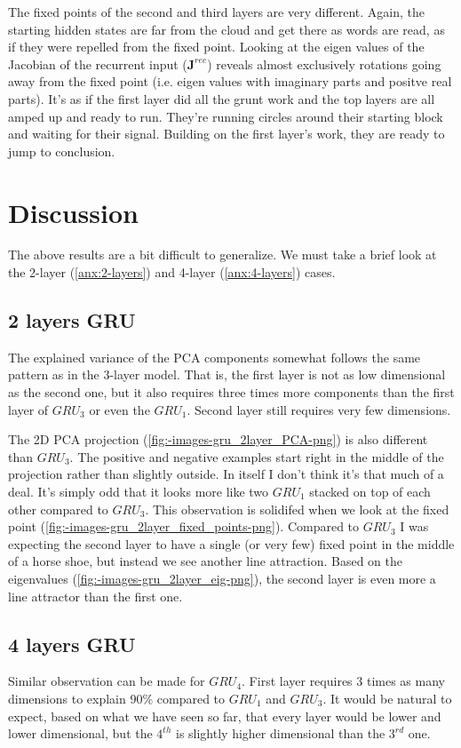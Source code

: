 \documentclass{article}
\begin{document}
The fixed points of the second and third layers are very different. Again, the starting hidden states are far from the cloud and get there as words are read, as if they were repelled from the fixed point. Looking at the eigen values of the Jacobian of the recurrent input ($\textbf{J}^{rec}$) reveals almost exclusively rotations going away from the fixed point (i.e. eigen values with imaginary parts and positve real parts). It's as if the first layer did all the grunt work and the top layers are all amped up and ready to run. They're running circles around their starting block and waiting for their signal. Building on the first layer's work, they are ready to jump to conclusion.

\section{Discussion}

The above results are a bit difficult to generalize. We must take a brief look at the 2-layer (\ref{anx:2-layers}) and 4-layer (\ref{anx:4-layers}) cases.

\subsection{2 layers GRU}
The explained variance of the PCA components somewhat follows the same pattern as in the 3-layer model. That is, the first layer is not as low dimensional as the second one, but it also requires three times more components than the first layer of $GRU_3$ or even the $GRU_1$. Second layer still requires very few dimensions.

The 2D PCA projection (\ref{fig:-images-gru_2layer_PCA-png}) is also different than $GRU_3$. The positive and negative examples start right in the middle of the projection rather than slightly outside. In itself I don't think it's that much of a deal. It's simply odd that it looks more like two $GRU_1$ stacked on top of each other compared to $GRU_3$. This observation is solidifed when we look at the fixed point (\ref{fig:-images-gru_2layer_fixed_points-png}). Compared to $GRU_3$ I was expecting the second layer to have a single (or very few) fixed point in the middle of a horse shoe, but instead we see another line attraction. Based on the eigenvalues (\ref{fig:-images-gru_2layer_eig-png}), the second layer is even more a line attractor than the first one.

\subsection{4 layers GRU}
Similar observation can be made for $GRU_4$. First layer requires 3 times as many dimensions to explain 90\% compared to $GRU_1$ and $GRU_3$. It would be natural to expect, based on what we have seen so far, that every layer would be lower and lower dimensional, but the $4^{th}$ is slightly higher dimensional than the $3^{rd}$ one.
\end{document}
